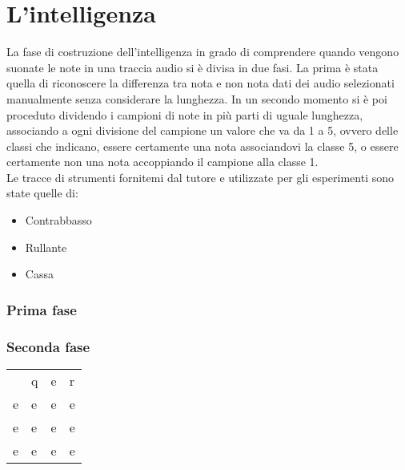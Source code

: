 \chapter{L'intelligenza}
La fase di costruzione dell'intelligenza in grado di comprendere quando vengono suonate le note in una traccia audio si è divisa in due fasi. La prima è stata quella di riconoscere la differenza tra nota e non nota dati dei audio selezionati manualmente senza considerare la lunghezza. In un secondo momento si è poi proceduto dividendo i campioni di note in più parti di uguale lunghezza, associando a ogni divisione del campione un valore che va da 1 a 5, ovvero delle classi che indicano, essere certamente una nota associandovi la classe 5, o essere certamente non una nota accoppiando il campione alla classe 1.\\
Le tracce di strumenti fornitemi dal tutore e utilizzate per gli esperimenti sono state quelle di: 
\begin{itemize}
	\item Contrabbasso
	\item Rullante
	\item Cassa
\end{itemize}


\subsection{Prima fase}
\subsection{Seconda fase}
\begin{table}
	\centering
	\begin{tabular}{llll}
		& q & e & r  \\
		e & e & e & e  \\
		e & e & e & e  \\
		e & e & e & e 
	\end{tabular}
\end{table}